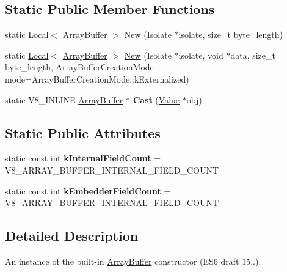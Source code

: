\subsection*{Static Public Member Functions}
\begin{DoxyCompactItemize}
\item 
static \mbox{\hyperlink{classv8_1_1Local}{Local}}$<$ \mbox{\hyperlink{classv8_1_1ArrayBuffer}{Array\+Buffer}} $>$ \mbox{\hyperlink{classv8_1_1ArrayBuffer_ad752e03d7cc7fe863656ad6183785ab7}{New}} (Isolate $\ast$isolate, size\+\_\+t byte\+\_\+length)
\item 
static \mbox{\hyperlink{classv8_1_1Local}{Local}}$<$ \mbox{\hyperlink{classv8_1_1ArrayBuffer}{Array\+Buffer}} $>$ \mbox{\hyperlink{classv8_1_1ArrayBuffer_acc65e714766b0d0d791b0d43ec52d0bb}{New}} (Isolate $\ast$isolate, void $\ast$data, size\+\_\+t byte\+\_\+length, Array\+Buffer\+Creation\+Mode mode=Array\+Buffer\+Creation\+Mode\+::k\+Externalized)
\item 
\mbox{\label{classv8_1_1ArrayBuffer_a4b0a703ae34217507a8ebc9cabf7336a}} 
static V8\+\_\+\+I\+N\+L\+I\+NE \mbox{\hyperlink{classv8_1_1ArrayBuffer}{Array\+Buffer}} $\ast$ {\bfseries Cast} (\mbox{\hyperlink{classv8_1_1Value}{Value}} $\ast$obj)
\end{DoxyCompactItemize}
\subsection*{Static Public Attributes}
\begin{DoxyCompactItemize}
\item 
\mbox{\label{classv8_1_1ArrayBuffer_af49000a2ea120e49da846ef02a42ac69}} 
static const int {\bfseries k\+Internal\+Field\+Count} = V8\+\_\+\+A\+R\+R\+A\+Y\+\_\+\+B\+U\+F\+F\+E\+R\+\_\+\+I\+N\+T\+E\+R\+N\+A\+L\+\_\+\+F\+I\+E\+L\+D\+\_\+\+C\+O\+U\+NT
\item 
\mbox{\label{classv8_1_1ArrayBuffer_ae383ba945bf84433c8cd3de5d3d56345}} 
static const int {\bfseries k\+Embedder\+Field\+Count} = V8\+\_\+\+A\+R\+R\+A\+Y\+\_\+\+B\+U\+F\+F\+E\+R\+\_\+\+I\+N\+T\+E\+R\+N\+A\+L\+\_\+\+F\+I\+E\+L\+D\+\_\+\+C\+O\+U\+NT
\end{DoxyCompactItemize}


\subsection{Detailed Description}
An instance of the built-\/in \mbox{\hyperlink{classv8_1_1ArrayBuffer}{Array\+Buffer}} constructor (E\+S6 draft 15..). 

